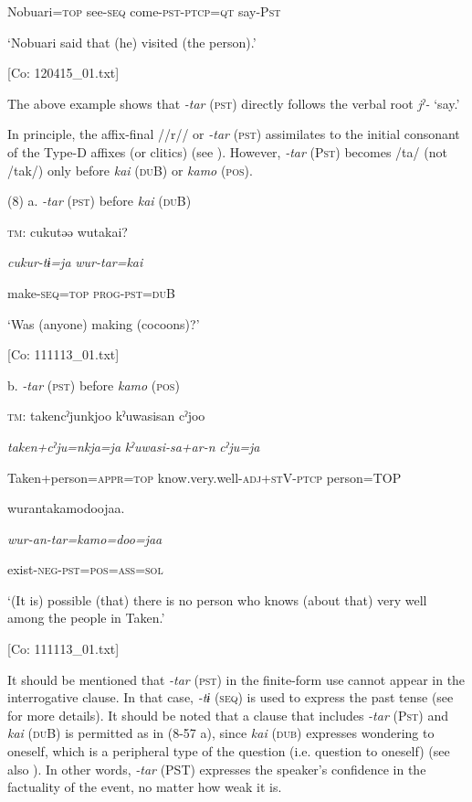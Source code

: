     Nobuari=\textsc{top}  see-\textsc{seq}  come-\textsc{pst}-\textsc{ptcp}=\textsc{qt}  say-P\textsc{st}

    ‘Nobuari said that (he) visited (the person).’

    [Co: 120415\_01.txt]

The above example shows that \textit{{}-tar} (\textsc{pst}) directly follows the verbal root \textit{jˀ-} ‘say.’

In principle, the affix-final //r// or \textit{{}-tar} (\textsc{pst}) assimilates to the initial consonant of the Type-D affixes (or clitics) (see ). However, \textit{{}-tar} (P\textsc{st}) becomes /ta/ (not /tak/) only before \textit{kai} (\textsc{du}B) or \textit{kamo} (\textsc{pos}).

(8)  a. \textit{{}-tar} (\textsc{pst}) before \textit{kai} (\textsc{du}B)

  \textsc{tm}:  cukutəə  wutakai?

    \textit{cukur-tɨ=ja}  \textit{wur-tar=kai}

    make-\textsc{seq}=\textsc{top}  \textsc{prog}-\textsc{pst}=\textsc{du}B

    ‘Was (anyone) making (cocoons)?’

    [Co: 111113\_01.txt]

  b. \textit{{}-tar} (\textsc{pst}) before \textit{kamo} (\textsc{pos})

  \textsc{tm}:  takencˀjunkjoo  kˀuwasisan  cˀjoo

    \textit{taken+cˀju=nkja=ja}  \textit{kˀuwasi-sa+ar-n}  \textit{cˀju=ja}

    Taken+person=\textsc{appr}=\textsc{top}  know.very.well-\textsc{adj}+\textsc{st}V-\textsc{ptcp}  person=TOP

    wurantakamodoojaa.

    \textit{wur-an-tar=kamo=doo=jaa}

    exist-\textsc{neg}-\textsc{pst}=\textsc{pos}=\textsc{ass}=\textsc{sol}

    ‘(It is) possible (that) there is no person who knows (about that) very well among the people in Taken.’

    [Co: 111113\_01.txt]

  It should be mentioned that \textit{{}-tar} (\textsc{pst}) in the finite-form use cannot appear in the interrogative clause. In that case, \textit{{}-tɨ} (\textsc{seq}) is used to express the past tense (see  for more details). It should be noted that a clause that includes \textit{{}-tar} (P\textsc{st}) and \textit{kai} (\textsc{du}B) is permitted as in (8-57 a), since \textit{kai} (\textsc{dub}) expresses wondering to oneself, which is a peripheral type of the question (i.e. question to oneself) (see also ). In other words, \textit{{}-tar} (PST) expresses the speaker’s confidence in the factuality of the event, no matter how weak it is.

